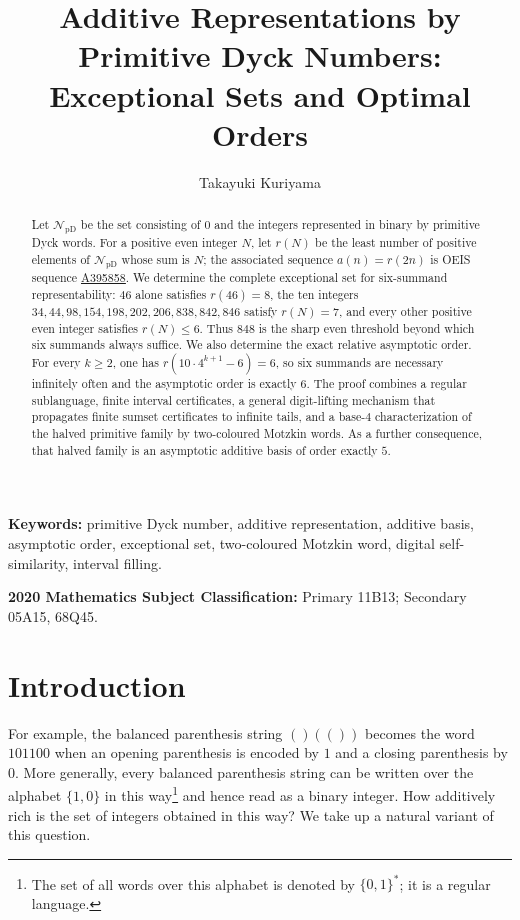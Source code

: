 \documentclass[12pt]{article}
\title{Additive Representations by Primitive Dyck Numbers:\\ Exceptional Sets and Optimal Orders}
\author{Takayuki Kuriyama}
\date{}
\theoremstyle{plain}
\theoremstyle{definition}
\theoremstyle{plain}
\newcommand{\NpD}{\mathcal{N}_{\mathrm{pD}}}
\newcommand{\seqnum}[1]{\href{https://oeis.org/#1}{\rm \underline{#1}}}
\begin{document}
\maketitle

\begin{abstract}
Let $\NpD$ be the set consisting of $0$ and the integers represented in
binary by primitive Dyck words.  For a positive even integer $N$, let $r(N)$
be the least number of positive elements of $\NpD$ whose sum is $N$; the
associated sequence $a(n)=r(2n)$ is OEIS sequence \seqnum{A395858}.  We
determine the complete exceptional set for six-summand representability:
$46$ alone satisfies $r(46)=8$, the ten integers
$34,44,98,154,198,202,206,838,842,846$ satisfy $r(N)=7$, and every other
positive even integer satisfies $r(N)\leq6$.  Thus $848$ is the sharp even
threshold beyond which six summands always suffice.  We also determine the
exact relative asymptotic order.  For every $k\geq2$, one has
$r(10\cdot4^{k+1}-6)=6$, so six summands are necessary infinitely often and the asymptotic order is
exactly $6$.  The proof combines a regular sublanguage, finite interval
certificates, a general digit-lifting mechanism that propagates finite
sumset certificates to infinite tails, and a base-$4$ characterization of
the halved primitive family by two-coloured Motzkin words.
As a further consequence, that halved family is an asymptotic additive basis
of order exactly $5$.
\end{abstract}

\noindent\textbf{Keywords:} primitive Dyck number, additive
representation, additive basis, asymptotic order, exceptional set,
two-coloured Motzkin word, digital self-similarity, interval filling.

\noindent\textbf{2020 Mathematics Subject Classification:} Primary 11B13;
Secondary 05A15, 68Q45.

\section{Introduction}\label{sec:introduction}

For example, the balanced parenthesis string $()(())$ becomes the word
$101100$ when an opening parenthesis is encoded by $1$ and a closing
parenthesis by $0$.  More generally, every balanced parenthesis string can
be written over the alphabet $\{1,0\}$ in this way\footnote{The set of all
words over this alphabet is denoted by $\{0,1\}^*$; it is a regular
language.} and hence read as a binary integer.  How additively rich is the
set of integers obtained in this way?  We take up a natural variant of this
question.
\end{document}
